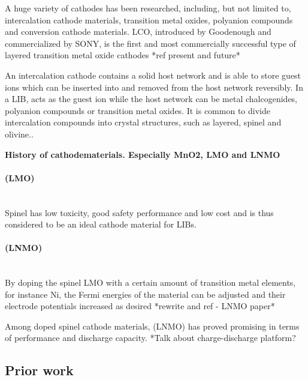 \documentclass[Main/main.tex]{subfiles}
\begin{document}
A huge variety of cathodes has been researched, including, but not limited to, intercalation cathode materials, transition metal oxides, polyanion compounds and conversion cathode materials. LCO, introduced by Goodenough and commercialized by SONY, is the first and most commercially successful type of layered transition metal oxide cathodes *ref present and future* 

An intercalation cathode contains a solid host network and is able to store guest ions which can be inserted into and removed from the host network reversibly. In a LIB,  acts as the guest ion while the host network can be metal chalcogenides, polyanion compounds or transition metal oxides. It is common to divide intercalation compounds into crystal structures, such as layered, spinel and olivine.. \cite{1_rev_liion}

\textbf{History of cathodematerials. Especially MnO2, LMO and LNMO}

\paragraph{}


\paragraph{ (LMO)}~\\[0.8em]
Spinel  has low toxicity, good safety performance and low cost and is thus considered to be an ideal cathode material for LIBs.

\paragraph{ (LNMO)}~\\[0.8em]
By doping the spinel LMO with a certain amount of transition metal elements, for instance Ni, the Fermi energies of the material can be adjusted and their electrode potentials increased as desired *rewrite and ref - LNMO paper*

Among doped spinel cathode materials,  (LNMO) has proved promising in terms of performance and discharge capacity. *Talk about charge-discharge platform?

\subsection{Prior work}
\end{document}
